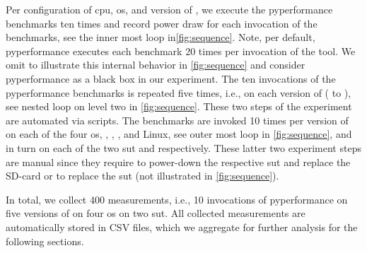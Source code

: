 Per configuration of \gls{cpu}, \gls{os}, and version of \python, we execute the \gls{pyperformance} benchmarks ten times and record power draw for each invocation of the benchmarks, see the inner most loop in\autoref{fig:sequence}.
Note, per default, \gls{pyperformance} executes each benchmark 20 times per invocation of the tool.
We omit to illustrate this internal behavior in \autoref{fig:sequence} and consider \gls{pyperformance} as a black box in our experiment.
The ten invocations of the \gls{pyperformance} benchmarks is repeated five times, i.e., on each version of \python ( to ), see nested loop on level two in \autoref{fig:sequence}.
These two steps of the experiment are automated via scripts.
The benchmarks are invoked 10 times per version of \python on each of the four \gls{os}, , , , and  Linux, see outer most loop in \autoref{fig:sequence}, and in turn on each of the two \gls{sut}  and  respectively.
These latter two experiment steps are manual since they require to power-down the respective \gls{sut} and replace the SD-card or to replace the \gls{sut} (not illustrated in \autoref{fig:sequence}).

In total, we collect 400 measurements, i.e., 10 invocations of \gls{pyperformance} on five versions of \python on four \gls{os} on two \gls{sut}.
All collected measurements are automatically stored in CSV files, which we aggregate for further analysis for the following sections.